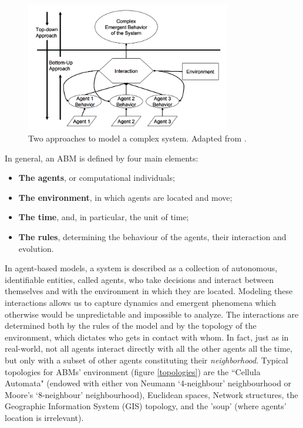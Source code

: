 \begin{figure}
    \centering
    \includegraphics[width=0.8\textwidth]{tex/pics/abm_bottomup.png}
    \caption{Two approaches to model a complex system. Adapted from \textcite{bernhardt2007agent}.}
    \label{abm_bu}
\end{figure}

In general, an ABM is defined by four main elements:
\begin{itemize}
    \item \textbf{The agents}, or computational individuals;
    \item \textbf{The environment}, in which agents are located and move;
    \item \textbf{The time}, and, in particular, the unit of time;
    \item \textbf{The rules}, determining the behaviour of the agents, their interaction and evolution.
\end{itemize}
In agent-based models, a system is described as a collection of autonomous, identifiable entities, called agents, who take decisions and interact between themselves and with the environment in which they are located. Modeling these interactions allows us to capture dynamics and emergent phenomena which otherwise would be unpredictable and impossible to analyze. The interactions are determined both by the rules of the model and by the topology of the environment, which dictates who gets in contact with whom. In fact, just as in real-world, not all agents interact directly with all the other agents all the time, but only with a subset of other agents constituting their \textit{neighborhood}. Typical topologies for ABMs' environment (figure \ref{topologies}) are the ``Cellula Automata" (endowed with either von Neumann ‘4-neighbour’ neighbourhood or Moore's ‘8-neighbour’ neighbourhood), Euclidean spaces, Network structures, the Geographic Information System (GIS) topology, and the 'soup' (where agents' location is irrelevant).  

